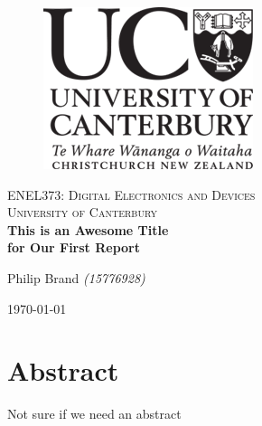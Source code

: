 \documentclass[12pt]{article}
\begin{document}
\begin{titlepage}
    \begin{center}
      \begin{figure}
        \includegraphics[right]{logo.png}
      \end{figure}
      \vspace*{1cm}
      \textsc{\large ENEL373: Digital Electronics and Devices}\\[0.5cm]
      \textsc{\Large University of Canterbury}\\[3.5cm]
      \linespread{1}
      {\Huge\bfseries This is an Awesome Title \\[0.3cm] for Our First Report} \\
      \vspace*{2cm}
      {\Huge Philip Brand \textit{\Large(15776928)}\\\par}
      \vspace*{3cm}
      {\LARGE \today}
    \end{center}
  \end{titlepage}
\restoregeometry

\fancyhead{}
\fancyhead[R]{\small{\today}}


\section*{Abstract}

Not sure if we need an abstract

\newpage

\renewcommand{\baselinestretch}{1.3}\normalsize
\setlength{\cftbeforesecskip}{0.3em}
\renewcommand{\cftsecleader}{\cftdotfill{\cftdotsep}}
\tableofcontents\thispagestyle{fancy}
\renewcommand{\baselinestretch}{1}\normalsize
\end{document}
